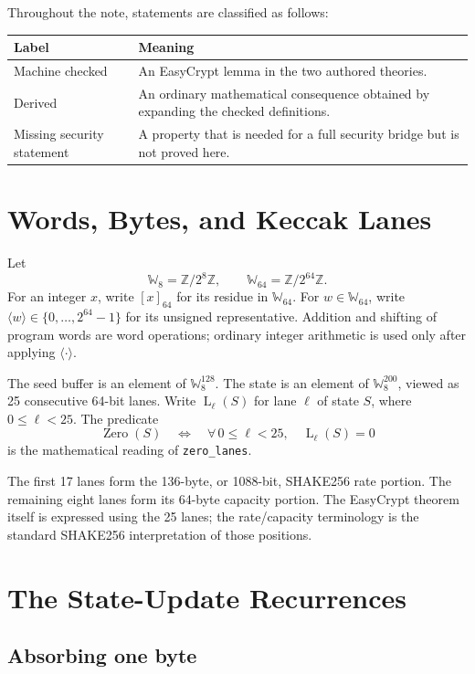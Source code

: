 \documentclass[11pt]{article}
\theoremstyle{definition}
\theoremstyle{plain}
\theoremstyle{remark}
\newcommand{\code}[1]{\nolinkurl{#1}}
\newcommand{\Z}{\mathbb Z}
\newcommand{\Wviii}{\mathbb W_{8}}
\newcommand{\Wlxiv}{\mathbb W_{64}}
\newcommand{\enc}[1]{\left[#1\right]_{64}}
\newcommand{\uint}[1]{\langle #1\rangle}
\newcommand{\Lane}{\operatorname{L}}
\begin{document}
Throughout the note, statements are classified as follows:
\begin{center}
\begin{tabularx}{0.94\textwidth}{>{\raggedright\arraybackslash}p{}X}
\toprule
Label & Meaning \\
\midrule
\textcolor{artifactgreen}{Machine checked} & An EasyCrypt lemma in the two authored theories. \\
\textcolor{artifactblue}{Derived} & An ordinary mathematical consequence obtained by expanding the checked definitions. \\
\textcolor{artifactred}{Missing security statement} & A property that is needed for a full security bridge but is not proved here. \\
\bottomrule
\end{tabularx}
\end{center}

\section{Words, Bytes, and Keccak Lanes}

Let
\[
  \Wviii=\Z/2^8\Z,
  \qquad
  \Wlxiv=\Z/2^{64}\Z.
\]
For an integer $x$, write $\enc{x}$ for its residue in $\Wlxiv$.  For
$w\in\Wlxiv$, write $\uint{w}\in\{0,\ldots,2^{64}-1\}$ for its unsigned
representative.  Addition and shifting of program words are word operations;
ordinary integer arithmetic is used only after applying $\uint{\cdot}$.

The seed buffer is an element of $\Wviii^{128}$.  The state is an element of
$\Wviii^{200}$, viewed as 25 consecutive 64-bit lanes.  Write $\Lane_\ell(S)$
for lane $\ell$ of state $S$, where $0\le\ell<25$.  The predicate
\[
  \operatorname{Zero}(S)
  \quad\Longleftrightarrow\quad
  \forall\,0\le\ell<25,\quad \Lane_\ell(S)=0
\]
is the mathematical reading of \code{zero_lanes}.

The first 17 lanes form the 136-byte, or 1088-bit, SHAKE256 rate portion.  The
remaining eight lanes form its 64-byte capacity portion.  The EasyCrypt
theorem itself is expressed using the 25 lanes; the rate/capacity terminology
is the standard SHAKE256 interpretation of those positions.

\section{The State-Update Recurrences}

\subsection{Absorbing one byte}
\end{document}
